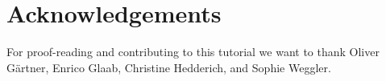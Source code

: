 \documentclass[12pt,twoside]{report}
\begin{document}
\chapter*{Acknowledgements}

For proof-reading and contributing to this tutorial we want to thank
Oliver G\"{a}rtner, Enrico Glaab, Christine Hedderich,
and Sophie Weggler.

\newpage
{}
\small
\printindex
\normalsize

\renewcommand{\bibname}{References}


\end{document}
